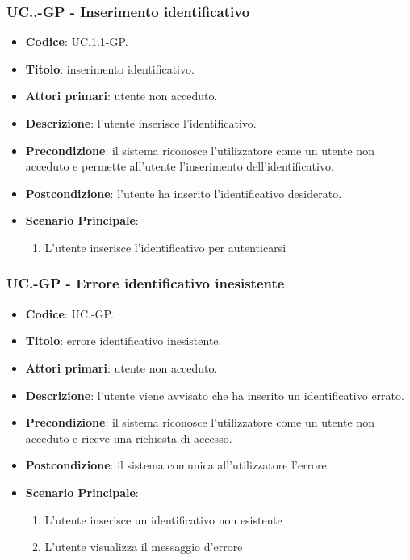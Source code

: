 		\subsubsection{UC\theuccount.\thesubuccount.\thesubsubuccount-GP - Inserimento identificativo}
			\begin{itemize}
				\item \textbf{Codice}: UC\theuccount.1.1-GP.
				\item \textbf{Titolo}: inserimento identificativo.
				\item \textbf{Attori primari}: utente non acceduto.
				\item \textbf{Descrizione}: l'utente inserisce l'identificativo.
				\item \textbf{Precondizione}: il sistema riconosce l'utilizzatore come un utente non acceduto e permette all'utente l'inserimento dell'identificativo.
				\item \textbf{Postcondizione}: l'utente ha inserito l'identificativo desiderato.
				\item \textbf{Scenario Principale}:
				\begin{enumerate}
					\item L'utente inserisce l'identificativo per autenticarsi
				\end{enumerate}
			\end{itemize}
	
	\subsubsection{UC\theuccount.\thesubuccount-GP - Errore identificativo inesistente}
		\begin{itemize}
			\item \textbf{Codice}: UC\theuccount.\thesubuccount-GP.
			\item \textbf{Titolo}: errore identificativo inesistente.
			\item \textbf{Attori primari}: utente non acceduto.
			\item \textbf{Descrizione}: l'utente viene avvisato che ha inserito un identificativo errato.
			\item \textbf{Precondizione}: il sistema riconosce l'utilizzatore come un utente non acceduto e riceve una richiesta di accesso. 
			\item \textbf{Postcondizione}: il sistema comunica all'utilizzatore l'errore.
			\item \textbf{Scenario Principale}:
			\begin{enumerate}
				\item L'utente inserisce un identificativo non esistente
				\item L'utente visualizza il messaggio d'errore
			\end{enumerate}
		\end{itemize}
